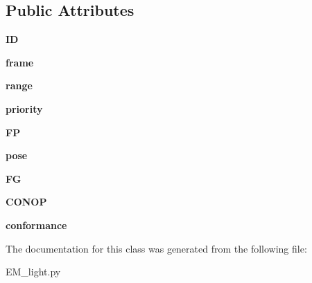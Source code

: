 \subsection*{Public Attributes}
\begin{DoxyCompactItemize}
\item 
{\bfseries ID}\hypertarget{classEM__light_1_1UAS_aef0a775ce78bb49d183fc3dd56dd02db}{}\label{classEM__light_1_1UAS_aef0a775ce78bb49d183fc3dd56dd02db}

\item 
{\bfseries frame}\hypertarget{classEM__light_1_1UAS_a5b310c73ede963abcc12c65f9e9ea951}{}\label{classEM__light_1_1UAS_a5b310c73ede963abcc12c65f9e9ea951}

\item 
{\bfseries range}\hypertarget{classEM__light_1_1UAS_a1eadfe0883e74291e6b75bc4d068e82d}{}\label{classEM__light_1_1UAS_a1eadfe0883e74291e6b75bc4d068e82d}

\item 
{\bfseries priority}\hypertarget{classEM__light_1_1UAS_a8a46db7eb1e6ac1e179f8509a4349f3e}{}\label{classEM__light_1_1UAS_a8a46db7eb1e6ac1e179f8509a4349f3e}

\item 
{\bfseries FP}\hypertarget{classEM__light_1_1UAS_ae062d47c573fcfdf889a4bc0169552e0}{}\label{classEM__light_1_1UAS_ae062d47c573fcfdf889a4bc0169552e0}

\item 
{\bfseries pose}\hypertarget{classEM__light_1_1UAS_a848d3853083a3b3b96cfb821126362d6}{}\label{classEM__light_1_1UAS_a848d3853083a3b3b96cfb821126362d6}

\item 
{\bfseries FG}\hypertarget{classEM__light_1_1UAS_ad93a96aebd78b5d24fd0b955ae97d581}{}\label{classEM__light_1_1UAS_ad93a96aebd78b5d24fd0b955ae97d581}

\item 
{\bfseries C\+O\+N\+OP}\hypertarget{classEM__light_1_1UAS_aa8b3ff93c84383c69a3b97b9f8e70e4e}{}\label{classEM__light_1_1UAS_aa8b3ff93c84383c69a3b97b9f8e70e4e}

\item 
{\bfseries conformance}\hypertarget{classEM__light_1_1UAS_a90c298422e5fa20ffebba9be4b1bcb38}{}\label{classEM__light_1_1UAS_a90c298422e5fa20ffebba9be4b1bcb38}

\end{DoxyCompactItemize}


The documentation for this class was generated from the following file\+:\begin{DoxyCompactItemize}
\item 
E\+M\+\_\+light.\+py\end{DoxyCompactItemize}
